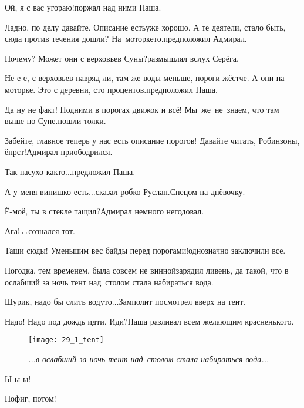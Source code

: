 \diagdash Ой, я с вас угораю!\mdash поржал над ними Паша.

\diagdash Ладно, по делу давайте. Описание есть\mdash уже хорошо. А те деятели, стало быть, сюда против течения дошли? На~моторке\sdash то.\mdash предположил Адмирал.

\diagdash Почему? Может они с верховьев Суны?\mdash размышлял вслух Серёга.

\diagdash Не-е-е, с верховьев навряд ли, там же воды меньше, пороги жёстче. А они на моторке. Это с деревни, сто процентов.\mdash предположил Паша.%

\diagdash Да ну не факт! Подними в порогах движок и всё! Мы~же~не~знаем, что там выше по Суне.\mdash пошли толки.

\diagdash Забейте, главное теперь у нас есть описание порогов! Давайте читать, Робинзоны, ёпрст!\mdash Адмирал приободрился.

\diagdash Так насухо как\sdash то$\ldots$\mdash предложил Паша.

\diagdash А у меня винишко есть$\ldots$\mdash сказал робко Руслан.\mdash Спецом на днёвочку.

\diagdash Ё-моё, ты в стекле тащил?\mdash Адмирал немного негодовал.

\diagdash Ага$\exldots$\mdash сознался тот.


\diagdash Тащи сюды! Уменьшим вес байды перед порогами!\mdash однозначно заключили все.

Погодка, тем временем, была совсем не винной\mdash зарядил ливень, да такой, что в ослабший за ночь тент над~столом стала набираться вода.

\diagdash Шурик, надо бы слить воду\sdash то$\ldots$\mdash Замполит посмотрел вверх на тент.

\diagdash Надо! Надо под дождь идти. Иди?\mdash Паша разливал всем желающим красненького.

\begin{figure}[h]
	\centering
	\texttt{[image: 29\_1\_tent]}
	\caption{\small\textit{...в ослабший за ночь тент над~столом стала набираться вода...}}
\end{figure}

\diagdash Ы-ы-ы!

\diagdash Пофиг, потом!

